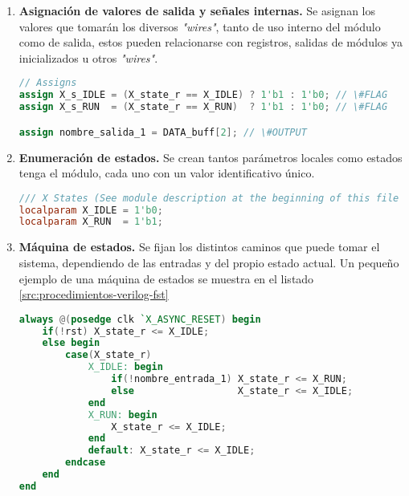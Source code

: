\begin{enumerate}
    \item{\textbf{Asignación de valores de salida y señales internas.}} Se asignan los valores que tomarán los diversos \emph{"wires"}, tanto de uso interno del módulo como de salida, estos pueden relacionarse con registros, salidas de módulos ya inicializados u otros \emph{"wires"}.
    \begin{lstlisting}[language=Verilog,
        caption={Ejemplo de asignación de valores.},
        label=src:procedimientos-verilog-asignacion]
// Assigns
assign X_s_IDLE = (X_state_r == X_IDLE) ? 1'b1 : 1'b0; // \#FLAG
assign X_s_RUN  = (X_state_r == X_RUN)  ? 1'b1 : 1'b0; // \#FLAG

assign nombre_salida_1 = DATA_buff[2]; // \#OUTPUT
    \end{lstlisting}
    

    \item{\textbf{Enumeración de estados.}} Se crean tantos parámetros locales como estados tenga el módulo, cada uno con un valor identificativo único.
    \begin{lstlisting}[language=Verilog,
        caption={Ejemplo de enumeración de estados.},
        label=src:procedimientos-verilog-estados]
/// X States (See module description at the beginning of this file to get more info)
localparam X_IDLE = 1'b0;
localparam X_RUN  = 1'b1;
    \end{lstlisting}
    

    \item{\textbf{Máquina de estados.}} Se fijan los distintos caminos que puede tomar el sistema, dependiendo de las entradas y del propio estado actual. Un pequeño ejemplo de una máquina de estados se muestra en el listado \ref{src:procedimientos-verilog-fst}
    \begin{lstlisting}[language=Verilog,
        caption={Ejemplo de máquina de estados.},
        label=src:procedimientos-verilog-fst]
always @(posedge clk `X_ASYNC_RESET) begin
    if(!rst) X_state_r <= X_IDLE;
    else begin
        case(X_state_r)
            X_IDLE: begin
                if(!nombre_entrada_1) X_state_r <= X_RUN;
                else                  X_state_r <= X_IDLE;
            end
            X_RUN: begin
                X_state_r <= X_IDLE;
            end
            default: X_state_r <= X_IDLE;
        endcase
    end
end
    \end{lstlisting}


\end{enumerate}
